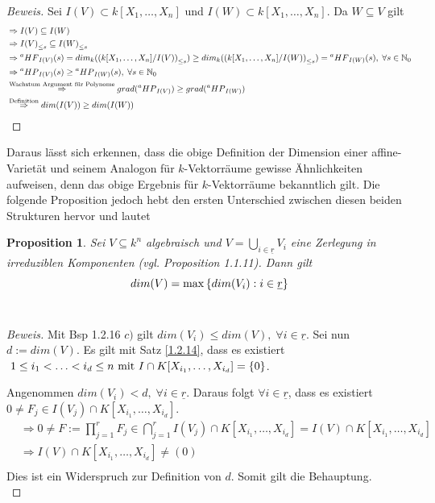 \documentclass{article}
\newtheorem{proposition}[satz]{Proposition}
\newcommand*{\R}{k[X_{1},\ldots,X_{n}]}
\newcommand*{\indx}[2]{{#1}_{#2}}
\newcommand*{\N}{\mathbb{N}_0}
\newcommand*{\hf}[1]{$\prescript{a}{}{HF}_{#1}$}
\newcommand*{\hp}[1]{$\prescript{a}{}{HP}_{#1}$}
\begin{document}
\begin{proof}[Beweis]
	Sei $I(V)\subset\R$ und $I(W)\subset\R$. Da $W\subseteq V$ gilt
	\begin{align*}
	 &\Rightarrow I(V)\subseteq I(W)\\ & 
	  \Rightarrow \indx{I(V)}{\leq s}\subseteq \indx{I(W)}{\leq s}\\&
	  \Rightarrow \textnormal{\hf{I(V)}}(s)=\indx{dim}{k}(\indx{(\R/I(V))}{\leq s})\geq \indx{dim}{k}(\indx{(\R/I(W))}{\leq s})= \textnormal{\hf{I(W)}}(s),\; \forall s\in \N \\&
	  \Rightarrow \textnormal{\hp{I(V)}}(s) \geq \textnormal{\hp{I(W)}}(s),\; \forall s\in \N \\&
	  \stackrel{\textnormal{Wachstum Argument für Polynome}}{\Rightarrow}grad(\textnormal{\hp{I(V)}}) \geq grad(\textnormal{\hp{I(W)}}) \\&
	  \stackrel{\textnormal{Definition}}{\Rightarrow} dim(I(V))\geq dim(I(W))
	\end{align*}
\end{proof}
Daraus lässt sich erkennen, dass die obige Definition der Dimension einer affine-Varietät und seinem Analogon für $k$-Vektorräume gewisse Ähnlichkeiten aufweisen, denn das obige Ergebnis für $k$-Vektorräume bekanntlich gilt. Die folgende Proposition jedoch hebt den ersten Unterschied zwischen diesen beiden Strukturen hervor und lautet

\begin{proposition}
	Sei $V\subseteq k^n$ algebraisch und $V=\bigcup\limits_{i\in\underline{r}}\indx{V}{i}$ eine Zerlegung in irreduziblen Komponenten (vgl. Proposition 1.1.11). Dann gilt
	\begin{displaymath}
	dim(V)=\max{\{dim(\indx{V}{i}):i\in\underline{r}\}}\\
	\end{displaymath}
	\\
\end{proposition}
\begin{proof}[Beweis]
	Mit Bsp 1.2.16 $c)$ gilt $dim(\indx{V}{i})\leq dim(V),\; \forall i\in \underline{r} $. Sei nun $d:=dim(V)$. Es gilt mit Satz \ref{1.2.14}, dass es existiert $\; 1\leq\indx{i}{1}<\ldots<\indx{i}{d}\leq n \textnormal{ mit } I\cap K[\indx{X}{\indx{i}{1}},\ldots,\indx{X}{\indx{i}{d}}]=\{0\}$.
	
	Angenommen $dim(\indx{V}{i})<d,\; \forall i\in \underline{r}$. Daraus folgt $\forall i\in \underline{r}$, dass es existiert $0\neq\indx{F}{j}\in I(\indx{V}{j})\cap K[\indx{X}{\indx{i}{1}},\ldots,\indx{X}{\indx{i}{d}}]$.
	\begin{align*}
	&\Rightarrow 0\neq F:=\prod_{j=1}^{r}\indx{F}{j}\in \bigcap\limits_{j=1}^{r}I(\indx{V}{j}) \cap K[\indx{X}{\indx{i}{1}},\ldots,\indx{X}{\indx{i}{d}}]=I(V) \cap K[\indx{X}{\indx{i}{1}},\ldots,\indx{X}{\indx{i}{d}}]\\&
	\Rightarrow I(V)\cap K[\indx{X}{\indx{i}{1}},\ldots,\indx{X}{\indx{i}{d}}]\neq (0)\\
	\end{align*}
	Dies ist ein Widerspruch zur Definition von $d$. Somit gilt die Behauptung.\\
\end{proof}
\end{document}
